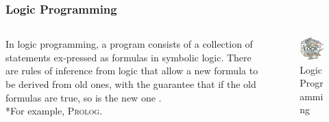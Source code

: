 \documentclass[aspectratio=1610]{beamer}
\begin{document}
\begin{frame}
\frametitle{Logic Programming}
  \begin{columns}[T]
    \begin{column}{.5\textwidth}
     \begin{block}{}
In logic programming, a program consists of a collection of statements ex-pressed as formulas in symbolic logic. There are rules of inference from logic that allow a new formula to be derived from old ones, with the guarantee that if the old formulas are true, so is the new one \cite{spivey1996introduction}.
\\*For example, \textsc{Prolog}.
    \end{block}
    \end{column}
    \begin{column}{.5\textwidth}
    \begin{block}{}
\begin{figure}
    \includegraphics[width=\textwidth]{logicprogramming.jpg} 
    \caption{Logic Programming \cite{logicprogwordcloud}}
 \end{figure}   
    \end{block}
    \end{column}
  \end{columns}
\end{frame}

\end{document}
